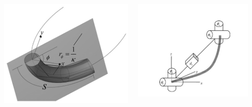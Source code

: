 \begin{frame}
\begin{columns}[b]
\begin{column}{.33\columnwidth}
\begin{tcolorbox}[colframe=blue!80!green, coltitle=white!80,toggle enlargement=none]
			\includegraphics[width=\textwidth, height=1.1\textwidth]{figures/multi_sec_manip.jpg}
			\end{tcolorbox}
		\end{column}	
		\begin{column}{.33\columnwidth}			
			\begin{tcolorbox}[colframe=blue!80!green, coltitle=white!80,toggle enlargement=none]
			\centering 
			\includegraphics[width=\textwidth, height=1.1\textwidth]{figures/multi_sec_scheme.jpg}

\end{tcolorbox}
\end{column}
\end{columns}
\end{frame}
